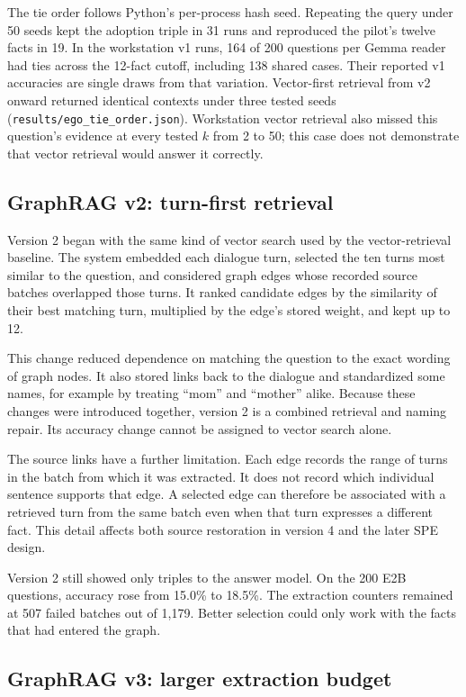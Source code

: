 The tie order follows Python's per-process hash seed. Repeating the query under 50 seeds
kept the adoption triple in 31 runs and reproduced the pilot's twelve facts in 19.
In the workstation v1 runs, 164 of 200 questions per Gemma reader had ties across the
12-fact cutoff, including 138 shared cases. Their reported v1 accuracies are single draws
from that variation. Vector-first retrieval from v2 onward returned identical contexts
under three tested seeds (\texttt{results/ego\_tie\_order.json}). Workstation vector
retrieval also missed this question's evidence at every tested $k$ from 2 to 50; this
case does not demonstrate that vector retrieval would answer it correctly.

\subsection{GraphRAG v2: turn-first retrieval}

Version 2 began with the same kind of vector search used by the vector-retrieval baseline.
The system embedded each dialogue turn, selected the ten turns most similar to the question,
and considered graph edges whose recorded source batches overlapped those turns. It ranked
candidate edges by the similarity of their best matching turn, multiplied by the edge's stored
weight, and kept up to 12.

This change reduced dependence on matching the question to the exact wording of graph nodes.
It also stored links back to the dialogue and standardized some names, for example by treating
``mom'' and ``mother'' alike. Because these changes were introduced together, version 2 is a
combined retrieval and naming repair. Its accuracy change cannot be assigned to vector search
alone.

The source links have a further limitation. Each edge records the range of turns in the batch
from which it was extracted. It does not record which individual sentence supports that edge.
A selected edge can therefore be associated with a retrieved turn from the same batch even
when that turn expresses a different fact. This detail affects both source restoration in
version 4 and the later SPE design.

Version 2 still showed only triples to the answer model. On the 200 E2B questions, accuracy
rose from 15.0\% to 18.5\%. The extraction counters remained at 507 failed
batches out of 1,179. Better selection could only work with the facts that had entered the graph.

\subsection{GraphRAG v3: larger extraction budget}

